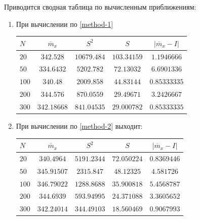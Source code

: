 Приводится сводная таблица по вычисленным приближениям:
\begin{enumerate}
	\item При вычислении по \cref{method-1}
	      \begin{table}[h!]
		      \centering
		      \begin{tabular}{|l|cccc|}
			      \hline
			      $N$   & $\overline{m}_x$ & $S^2$       & $S$         & $|\overline{m}_x - I|$ \\
			      \hline
			      $20$  & $342.528$        & $10679.484$ & $103.34159$ & $1.1946666$            \\
			      $50$  & $334.6432$       & $5202.782$  & $72.13032$  & $6.6901336$            \\
			      $100$ & $340.48$         & $2009.858$  & $44.83144$  & $0.85333335$           \\
			      $200$ & $344.576$        & $870.0559$  & $29.49671$  & $3.2426667$            \\
			      $300$ & $342.18668$      & $841.04535$ & $29.000782$ & $0.85333335$           \\
			      \hline
		      \end{tabular}

	      \end{table}

	\item При вычислении по \cref{method-2} выходит:
	      \begin{table}[h!]
		      \centering
		      \begin{tabular}{|l|cccc|}
			      \hline
			      $N$   & $\overline{m}_x$ & $S^2$       & $S$         & $|\overline{m}_x - I|$ \\
			      \hline
			      $20$  & $340.4964$       & $5191.2344$ & $72.050224$ & $0.8369446$            \\
			      $50$  & $345.91507$      & $2315.847$  & $48.12325$  & $4.581726$             \\
			      $100$ & $346.79022$      & $1288.8688$ & $35.900818$ & $5.4568787$            \\
			      $200$ & $344.6939$       & $593.94995$ & $24.371088$ & $3.3605652$            \\
			      $300$ & $342.24014$      & $344.49103$ & $18.560469$ & $0.9067993$            \\
			      \hline
		      \end{tabular}
	      \end{table}
\end{enumerate}

